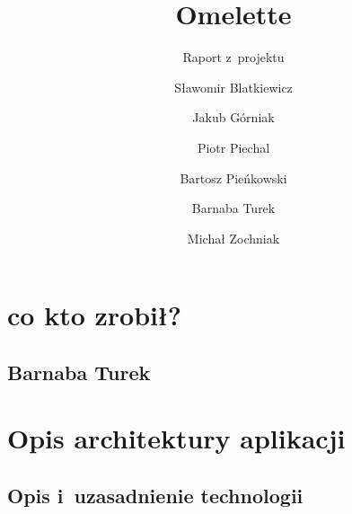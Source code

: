 \documentclass[a4paper]{scrartcl}
\begin{document}
\sloppy

\title{Omelette}
\subtitle{Raport z~projektu}
\author{
  Sławomir Blatkiewicz\and
  Jakub Górniak       \and
  Piotr Piechal       \and
  Bartosz Pieńkowski  \and
  Barnaba Turek       \and
  Michał Zochniak
}
\maketitle

\section{co kto zrobił?}
\subsection{Barnaba Turek}


\section{Opis architektury aplikacji}
\subsection{Opis i~uzasadnienie technologii}

\end{document}
